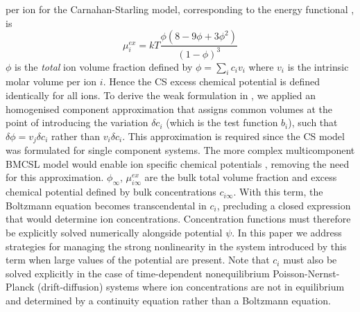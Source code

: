 per ion for the Carnahan-Starling model, corresponding to the energy
functional , is
\begin{equation}
    \mu_{i}^{ex} = kT \frac{\phi(8-9\phi+3\phi^2)}{(1-\phi)^3}
    \label{chem_pot_CS}
\end{equation}
$\phi$ is the \emph{total} ion volume fraction defined by
$\phi=\sum_i c_i v_i$ where $v_i$ is the intrinsic molar volume per
ion $i$. Hence the CS excess chemical potential is defined identically
for all ions. To derive the weak formulation in , we
applied an homogenised component approximation that assigns common
volumes at the point of introducing the variation  $\delta c_i$ (which
is the test function $b_i$), such that $\delta\phi=v_j \delta c_i$ rather
than $v_i \delta c_i$. This approximation is required since the CS
model was formulated for single component systems. The more complex
multicomponent BMCSL model would enable ion specific chemical
potentials \cite{MansooriCarnahanStarlingLeland1971}, removing the
need for this approximation.  $\phi_{\infty}$, $\mu_{i\infty}^{ex}$
are the bulk total volume fraction and excess chemical potential
defined by bulk concentrations $c_{i\infty}$. With this term, the
Boltzmann equation  becomes transcendental in $c_i$, precluding a closed
expression that would determine ion concentrations. Concentration functions must therefore be
explicitly solved  numerically alongside potential $\psi$. In this
paper we address strategies for managing the strong nonlinearity in
the system introduced by this term when large values of the
potential are present. Note that $c_i$ must also be solved explicitly in the case
of time-dependent nonequilibrium Poisson-Nernst-Planck (drift-diffusion) systems \cite{LopezGarciaHornoGrosse2018} where
ion concentrations are not in equilibrium and determined by a
continuity equation rather than a Boltzmann equation.


